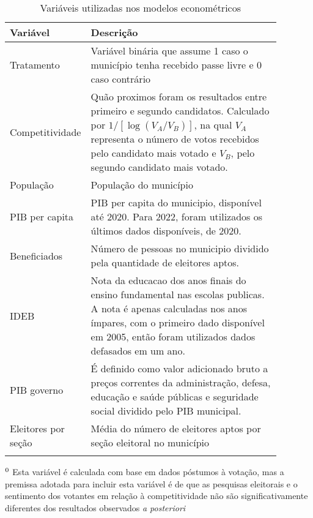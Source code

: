 \begin{table}
    \centering

    \begin{threeparttable}
        \caption{Variáveis utilizadas nos modelos econométricos}

        \begin{tabular}{m{0.18\linewidth}|m{0.7\linewidth}}
            Variável & Descrição \\
            \toprule\toprule
            Tratamento & Variável binária que assume 1 caso o município tenha recebido passe livre e 0 caso contrário \\
            \midrule[0.2pt]
            Competitividade & Quão proximos foram os resultados entre primeiro e segundo candidatos. Calculado por $1/[\log({V_A/V_B})]$, na qual $V_A$ representa o número de votos recebidos pelo candidato mais votado e $V_B$, pelo segundo candidato mais votado.\footnotemark \\
            \midrule[0.2pt]
            População & População do município \\
            \midrule[0.2pt]
            PIB per capita & PIB per capita do municipio, disponível até 2020. Para 2022, foram utilizados os últimos dados disponíveis, de 2020. \\
            \midrule[0.2pt]
            Beneficiados & Número de pessoas no municipio dividido pela quantidade de eleitores aptos. \\
            \midrule[0.2pt]
            IDEB & Nota da educacao dos anos finais do ensino fundamental nas escolas publicas. A nota é apenas calculadas nos anos ímpares, com o primeiro dado disponível em 2005, então foram utilizados dados defasados em um ano. \\
            \midrule[0.2pt]
            PIB governo & É definido como valor adicionado bruto a preços correntes da administração, defesa, educação e saúde públicas e seguridade social dividido pelo PIB municipal. \\
            \midrule[0.2pt]
            Eleitores por seção & Média do número de eleitores aptos por seção eleitoral no município \\

            \label{tab_variaveis}
        \end{tabular}
        \vspace{10pt}
        \begin{tablenotes}
            \small
            \item $^{\thefootnote}$ Esta variável é calculada com base em dados póstumos à votação, mas a premissa adotada para incluir esta variável é de que as pesquisas eleitorais e o sentimento dos votantes em relação à competitividade não são significativamente diferentes dos resultados observados \textit{a posteriori}
            
        \end{tablenotes}
    \end{threeparttable}
    
\end{table}
